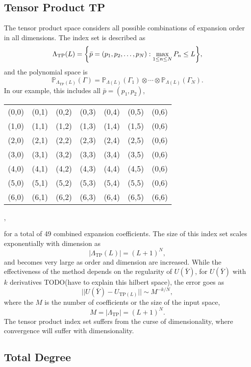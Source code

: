\subsection{Tensor Product TP}
The tensor product space considers all possible combinations of expansion order in all dimensions.  
The index set is described as
\begin{equation}
\Lambda_{\text{TP}}(L)=\qty{\bar p=(p_1,p_2,\ldots,p_N):\max_{1\leq n\leq N}P_n\leq L},
\end{equation}
and the polynomial space is
\begin{equation}
\mathbb{P}_{\Lambda_{\text{TP}}(L)}(\Gamma)=\mathbb{P}_{\Lambda(L)}(\Gamma_1)\otimes\cdots\otimes\mathbb{P}_{\Lambda(L)}(\Gamma_N).
\end{equation}
In our example, this includes all $\bar p=(p_1,p_2)$,
\begin{table}[H]
\centering
\begin{tabular}{c c c c c c c}
(0,0)&(0,1)&(0,2)&(0,3)&(0,4)&(0,5)&(0,6)\\
(1,0)&(1,1)&(1,2)&(1,3)&(1,4)&(1,5)&(0,6)\\
(2,0)&(2,1)&(2,2)&(2,3)&(2,4)&(2,5)&(0,6)\\
(3,0)&(3,1)&(3,2)&(3,3)&(3,4)&(3,5)&(0,6)\\
(4,0)&(4,1)&(4,2)&(4,3)&(4,4)&(4,5)&(0,6)\\
(5,0)&(5,1)&(5,2)&(5,3)&(5,4)&(5,5)&(0,6)\\
(6,0)&(6,1)&(6,2)&(6,3)&(6,4)&(6,5)&(6,6)
\end{tabular},
\end{table}\noindent
for a total of 49 combined expansion coefficients.  The size of this index set scales exponentially with dimension as
\begin{equation}
|\Lambda_{\text{TP}}(L)|=(L+1)^N,
\end{equation}
and becomes very large as order and dimension are increased.  While the effectiveness of the method depends on the regularity of $U(\bar Y)$, for $U(\bar Y)$ with $k$ derivatives TODO(have to explain this hilbert space), the error goes as
\begin{equation}
||U(\bar Y)-U_{\text{TP}(L)}||\sim M^{-k/N},
\end{equation}
where the $M$ is the number of coefficients or the size of the input space,
\begin{equation}
M=|\Lambda_\text{TP}|=(L+1)^N.
\end{equation}
The tensor product index set suffers from the curse of dimensionality, where convergence will suffer with dimensionality.

\subsection{Total Degree}
